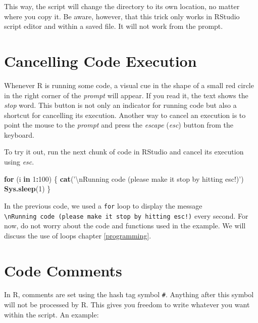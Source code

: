 \documentclass[11pt,]{book}
\newenvironment{Shaded}{\begin{snugshade}}{\end{snugshade}}
\newcommand{\KeywordTok}[1]{\textcolor[rgb]{0.27,0.27,0.27}{\textbf{#1}}}
\newcommand{\DecValTok}[1]{\textcolor[rgb]{0.06,0.06,0.06}{#1}}
\newcommand{\CharTok}[1]{\textcolor[rgb]{0.5,0.5,0.5}{#1}}
\newcommand{\StringTok}[1]{\textcolor[rgb]{0.5,0.5,0.5}{#1}}
\newcommand{\ControlFlowTok}[1]{\textcolor[rgb]{0.13,0.29,0.53}{\textbf{#1}}}
\newcommand{\OperatorTok}[1]{\textcolor[rgb]{0.81,0.36,0.00}{\textbf{#1}}}
\newcommand{\NormalTok}[1]{#1}
\begin{document}
This way, the script will change the directory to its own location, no
matter where you copy it. Be aware, however, that this trick only works
in RStudio script editor and within a saved file. It will not work from
the prompt.

\section{Cancelling Code Execution}\label{cancelling-code-execution}

Whenever R is running some code, a visual cue in the shape of a small
red circle in the right corner of the \emph{prompt} will appear. If you
read it, the text shows the \emph{stop} word. This button is not only an
indicator for running code but also a shortcut for cancelling its
execution. Another way to cancel an execution is to point the mouse to
the \emph{prompt} and press the \emph{escape} (\emph{esc}) button from
the keyboard.

To try it out, run the next chunk of code in RStudio and cancel its
execution using \emph{esc}.

\begin{Shaded}
\begin{Highlighting}[]
\ControlFlowTok{for}\NormalTok{ (i }\ControlFlowTok{in} \DecValTok{1}\OperatorTok{:}\DecValTok{100}\NormalTok{) \{}
  \KeywordTok{cat}\NormalTok{(}\StringTok{'}\CharTok{\textbackslash{}n}\StringTok{Running code (please make it stop by hitting esc!)'}\NormalTok{)}
  \KeywordTok{Sys.sleep}\NormalTok{(}\DecValTok{1}\NormalTok{)}
\NormalTok{\}}
\end{Highlighting}
\end{Shaded}

In the previous code, we used a \texttt{for} loop to display the message
\texttt{\textquotesingle{}\textbackslash{}nRunning\ code\ (please\ make\ it\ stop\ by\ hitting\ esc!)\textquotesingle{}}
every second. For now, do not worry about the code and functions used in
the example. We will discuss the use of loops chapter \ref{programming}.

\section{Code Comments}\label{code-comments}

In R, comments are set using the hash tag symbol \texttt{\#}. Anything
after this symbol will not be processed by R. This gives you freedom to
write whatever you want within the script. An example:
\end{document}

